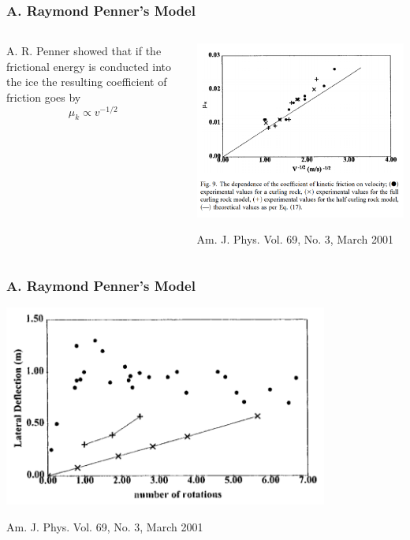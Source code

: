 \documentclass{beamer}
\begin{document}
\begin{frame}\frametitle{A. Raymond Penner's Model}
    \begin{columns}
        \begin{column}{0.3\textwidth}
            A. R. Penner showed that if the frictional energy is conducted into the ice the resulting coefficient of friction goes by
            $$\mu_k \propto v^{-1/2}$$
        \end{column}
        \begin{column}{0.7\textwidth}
            \includegraphics[width=1.0\textwidth]{Images/Mu_vs_V.png}

            \scriptsize{Am. J. Phys. Vol. 69, No. 3, March 2001}
        \end{column}
    \end{columns}
\end{frame}

\begin{frame}\frametitle{A. Raymond Penner's Model}
    \centering
    \includegraphics[width=0.8\textwidth]{Images/Deflection_vs_Angvel.png}

    \scriptsize{Am. J. Phys. Vol. 69, No. 3, March 2001}
\end{frame}
\end{document}
